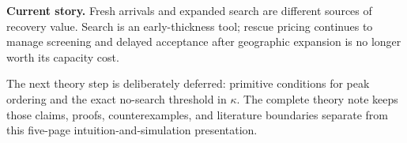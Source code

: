 \documentclass[11pt]{article}
\begin{document}
\medskip
\noindent\colorbox{softblue}{\parbox{.965\textwidth}{\small
\textbf{Current story.}  Fresh arrivals and expanded search are different
sources of recovery value.  Search is an early-thickness tool; rescue pricing
continues to manage screening and delayed acceptance after geographic expansion
is no longer worth its capacity cost.}}

\medskip
The next theory step is deliberately deferred: primitive conditions for peak
ordering and the exact no-search threshold in $\kappa$.  The complete theory
note keeps those claims, proofs, counterexamples, and literature boundaries
separate from this five-page intuition-and-simulation presentation.
\end{document}
